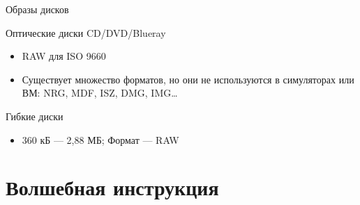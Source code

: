 \begin{frame}{Образы дисков}

Оптические диски CD/DVD/Blueray
\begin{itemize}
\item RAW для ISO 9660
\item Существует множество форматов, но они не используются в симуляторах или ВМ:
NRG, MDF, ISZ, DMG, IMG\dots
\end{itemize}

Гибкие диски
\begin{itemize}
\item 360 кБ — 2,88 МБ; Формат — RAW
\end{itemize}

\end{frame}





\section{Волшебная инструкция}

